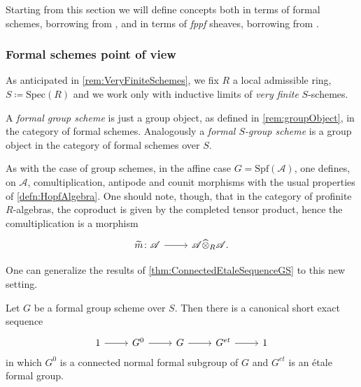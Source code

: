 \documentclass[../Main]{subfiles}
\begin{document}
Starting from this section we will define
concepts both in terms of formal schemes, borrowing from \cite{Shatz},
and in terms of {\em fppf} sheaves, borrowing from \cite{Messing}.



\subsubsection{Formal schemes point of view}
As anticipated in \cref{rem:VeryFiniteSchemes},
we fix $R$ a local admissible ring, $S \coloneqq \mathrm{Spec}(R)$
and we work only with inductive limits of {\em very finite} $S$-schemes.


\begin{defn}
	A {\em formal group scheme}
	is just a group object,
	as defined in \cref{rem:groupObject},
	in the category of formal schemes.
	Analogously a {\em formal $S$-group scheme}
	is a group object in the category of formal schemes over $S$.
\end{defn}


\begin{rem}[]\label{FormalHopf}
	As with the case of group schemes, in the affine case
	$G = \mathrm{Spf}(\mathscr{A})$,
	one defines, on $\mathscr{A}$, comultiplication, antipode and counit morphisms
	with the usual properties of \cref{defn:HopfAlgebra}.
	One should note, though, that in the category of 
	profinite $R$-algebras, the coproduct is given by
	the completed tensor product, hence the comultiplication
	is a morphism
	\begin{equation*}
	\begin{tikzcd}[row sep = 0ex
		,/tikz/column 1/.append style={anchor=base east}
		,/tikz/column 2/.append style={anchor=base west}]
		\widetilde{m}\colon \mathscr{A} \arrow[r, "", rightarrow] &
		\mathscr{A} \widehat{\otimes}_R \mathscr{A}
	.\end{tikzcd}
	\end{equation*} 
\end{rem}


\noindent
One can generalize the results of \cref{thm:ConnectedEtaleSequenceGS} to this new setting.
\begin{thm}\label{thm:ConnectedEtaleSeqFormalGr}
	Let $G$ be a formal group scheme over $S$.
	Then there is a canonical short exact sequence
	\begin{equation*}
	\begin{tikzcd}
		1 \arrow[r, "", rightarrow] &
		G^0 \arrow[r, "", rightarrow] &
		G \arrow[r, "", rightarrow] &
		G^{et} \arrow[r, "", rightarrow] &
		1
	\end{tikzcd}
	\end{equation*}
	in which $G^0$ is a connected normal formal subgroup of $G$
	and $G^{et}$ is an étale formal group.
\end{thm}
\end{document}
